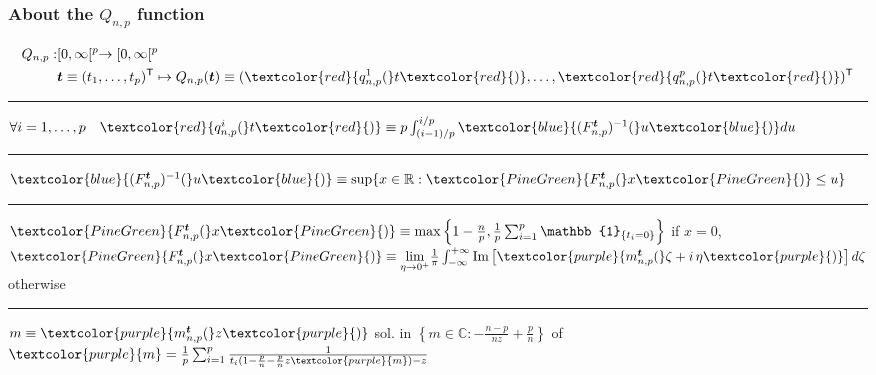 \documentclass[xcolor=dvipsnames]{beamer}
\def\B#1{\bm{#1}}
\def\trans{^\mathsf{T}}
\begin{document}
\begin{frame}
  \frametitle{About the $Q_{n,p}$ function}

  \begin{equation*}
    \begin{split}
      Q_{n,p}: & [0, \infty[^p \rightarrow [0,\infty[^p \\
              & \B{t} \equiv (t_1,\ldots,t_p)\trans
              \mapsto Q_{n,p}(\B{t}) \equiv
              (\textcolor{red}{q^1_{n,p}(}t\textcolor{red}{)},\ldots,\textcolor{red}{q^p_{n,p}(}t\textcolor{red}{)})\trans
    \end{split}
  \end{equation*}

  \vfill
  \hrule{}
  \vfill

  $\forall i = 1, \ldots, p \quad \textcolor{red}{q^i_{n,p}(}t\textcolor{red}{)} \equiv
  p\int_{(i-1)/p}^{i/p}\textcolor{blue}{(F^{\B{t}}_{n,p})^{-1}(}u\textcolor{blue}{)}du$

  \vfill
  \hrule{}
  \vfill
  
  $\textcolor{blue}{(F^{\B{t}}_{n,p})^{-1}(}u\textcolor{blue}{)} \equiv \sup\{x \in \mathbb{R}: \textcolor{PineGreen}{F^{\B{t}}_{n,p}(}x\textcolor{PineGreen}{)} \leq u\}$

  \vfill
  \hrule{}
  \vfill
  
  $\textcolor{PineGreen}{F^{\B{t}}_{n,p}(}x\textcolor{PineGreen}{)} \equiv \max \left\{1 - \frac{n}{p}, \frac{1}{p}\sum^p_{i=1}\mathbb{1}_{\{t_i = 0\}}\right\}$ if $x = 0$, $\textcolor{PineGreen}{F^{\B{t}}_{n,p}(}x\textcolor{PineGreen}{)} \equiv \underset{\eta \rightarrow 0^+}{\lim}\frac{1}{\pi}\int^{+\infty}_{-\infty}\text{Im}\left[\textcolor{purple}{m^{\B{t}}_{n,p}(}\zeta + i\,\eta\textcolor{purple}{)}\right]d\zeta$ otherwise

  \vfill
  \hrule{}
  \vfill

  $m \equiv \textcolor{purple}{m^{\B{t}}_{n,p}(}z\textcolor{purple}{)}$ sol. in $\left\{m \in \mathbb{C}: -\frac{n-p}{nz} + \frac{p}{n}\right\}$ of $\textcolor{purple}{m} = \frac{1}{p}\sum^p_{i=1}\frac{1}{t_i(1 - \frac{p}{n} - \frac{p}{n}z\textcolor{purple}{m}) - z}$

\end{frame}
\end{document}
